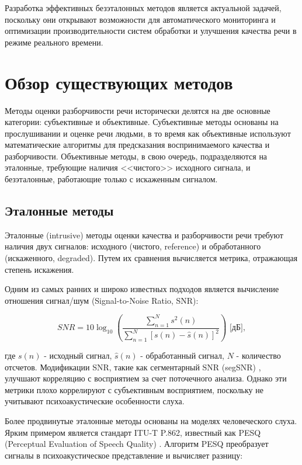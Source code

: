 \documentclass[oneside, final, 14pt]{extarticle}
\begin{document}
Разработка эффективных безэталонных методов является актуальной задачей, поскольку они открывают возможности для автоматического мониторинга и оптимизации производительности систем обработки и улучшения качества речи в режиме реального времени.

\newpage

\section{Обзор существующих методов}

Методы оценки разборчивости речи исторически делятся на две основные категории: субъективные и объективные. Субъективные методы основаны на прослушивании и оценке речи людьми, в то время как объективные используют математические алгоритмы для предсказания воспринимаемого качества и разборчивости. Объективные методы, в свою очередь, подразделяются на эталонные, требующие наличия <<чистого>> исходного сигнала, и безэталонные, работающие только с искаженным сигналом.

\subsection{Эталонные методы}

Эталонные (intrusive) методы оценки качества и разборчивости речи требуют наличия двух сигналов: исходного (чистого, reference) и обработанного (искаженного, degraded). Путем их сравнения вычисляется метрика, отражающая степень искажения.

Одним из самых ранних и широко известных подходов является вычисление отношения сигнал/шум (Signal-to-Noise Ratio, SNR):

\begin{equation}
	SNR = 10 \log_{10} \left( \frac{\sum_{n=1}^{N} s^2(n)}{\sum_{n=1}^{N} [s(n) - \hat{s}(n)]^2} \right) \text{ [дБ]},
\end{equation}

где $s(n)$ - исходный сигнал, $\hat{s}(n)$ - обработанный сигнал, $N$ - количество отсчетов. Модификации SNR, такие как сегментарный SNR (segSNR) \cite{DiPersia2007}, улучшают корреляцию с восприятием за счет поточечного анализа. Однако эти метрики плохо коррелируют с субъективным восприятием, поскольку не учитывают психоакустические особенности слуха.

Более продвинутые эталонные методы основаны на моделях человеческого слуха. Ярким примером является стандарт ITU-T P.862, известный как PESQ (Perceptual Evaluation of Speech Quality) \cite{Sharma2016, Zha2005}. Алгоритм PESQ преобразует сигналы в психоакустическое представление и вычисляет разницу:
\end{document}
